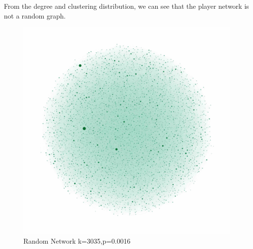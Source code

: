 \documentclass[runningheads]{llncs}
\begin{document}
From the degree and clustering distribution, we can see that the player network is not a random graph. 

\begin{figure}
\includegraphics[width=\textwidth]{4a_random_graph}
\caption{Random Network k=3035,p=0.0016} \label{fig_4a_random_graph}
\end{figure}
\end{document}
